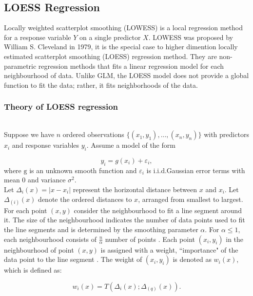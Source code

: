 \documentclass{article}\usepackage[]{graphicx}\usepackage[]{xcolor}
\numberwithin{equation}{section}
\begin{document}
\subsection{LOESS Regression}
\noindent
Locally weighted scatterplot smoothing (LOWESS) is a local regression method for a response variable $Y$ on a single predictor $X$. LOWESS was proposed by William S. Cleveland in 1979, it is the special case to higher dimention locally estimated scatterplot smoothing (LOESS) regression method. They are non-parametric regression methods that fits a linear regression model for each neighbourhood of data. Unlike GLM, the LOESS model does not provide a global function to fit the data; rather, it fits neighborhoods of the data.\\

\noindent
\subsubsection{Theory of LOESS regression}\\

\noindent
Suppose we have $n$ ordered observations $\{(x_1,y_1), \dots, (x_n,y_n)\}$ with predictors $x_i$ and response variables $y_i$. Assume a model of the form

$$y_i = g(x_i) +  \varepsilon_i,$$
\noindent
where $\mathrm{g}$ is an unknown smooth function and $\varepsilon_i$ is i.i.d.Gaussian error terms with mean $0$ and variance $\sigma^2$.\\

\noindent
Let $\Delta_i(x) = |x - x_i|$ represent the horizontal distance between $x$ and $x_i$. Let $\Delta_{(i)}(x)$ denote the ordered distances to $x$, arranged from smallest to largest.\\

\noindent
For each point $(x,y)$ consider the neighbourhood to fit a line segment around it. The size of the neighbourhood indicates the number of data points used to fit the line segments and is determined by the smoothing parameter $\alpha$. For $\alpha \leq 1$, each  neighbourhood consists of $\frac{n}{\alpha}$ number of points \cite{rloess}. Each point $(x_i, y_i)$ in the neighbourhood of point $(x,y)$ is assigned with a weight, ``importance" of the data point to the line segment \cite{ytloess}. The weight of $(x_i,y_i)$ is denoted as $w_i(x)$, which is defined as:

\begin{equation}\label{eq:4-7}
w_i(x) = T(\Delta_i (x); \Delta _{(q)}(x)).
\end{equation}
\end{document}
